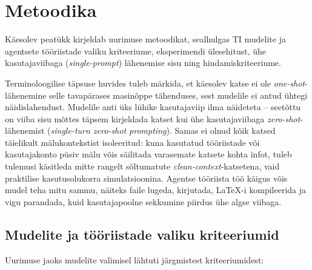 \section{Metoodika} \label{metoodika}

Käesolev peatükk kirjeldab uurimuse metoodikat, sealhulgas TI mudelite ja agentsete tööriistade valiku kriteeriume, eksperimendi ülesehitust, ühe kasutajaviibaga (\textit{single-prompt}) lähenemise sisu ning hindamiskriteeriume.

Terminoloogilise täpsuse huvides tuleb märkida, et käesolev katse ei ole \textit{one-shot}-lähenemine selle tavapärases masinõppe tähenduses, sest mudelile ei antud ühtegi näidislahendust. Mudelile anti üks lühike kasutajaviip ilma näideteta -- seetõttu on viiba sisu mõttes täpsem kirjeldada katset kui ühe kasutajaviibaga \textit{zero-shot}-lähenemist (\textit{single-turn zero-shot prompting}). Samas ei olnud kõik katsed täielikult mälukontekstist isoleeritud: kuna kasutatud tööriistade või kasutajakonto püsiv mälu võis säilitada varasemate katsete kohta infot, tuleb tulemusi käsitleda mitte rangelt sõltumatute \textit{clean-context}-katsetena, vaid praktilise kasutusolukorra simulatsioonina. Agentse tööriista töö käigus võis mudel teha mitu sammu, näiteks faile lugeda, kirjutada, \LaTeX{}-i kompileerida ja vigu parandada, kuid kasutajapoolne sekkumine piirdus ühe algse viibaga.

\subsection{Mudelite ja tööriistade valiku kriteeriumid} \label{subsec:valiku-kriteeriumid}

Uurimuse jaoks mudelite valimisel lähtuti järgmistest kriteeriumidest:

